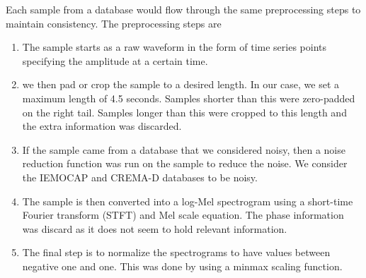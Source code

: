 \documentclass[conference]{IEEEtran}
\begin{document}
Each sample from a database would flow through the same preprocessing steps to maintain consistency. The preprocessing steps are
\begin{enumerate}
	\item The sample starts as a raw waveform in the form of time series points specifying the amplitude at a certain time.
	\item we then pad or crop the sample to a desired length. In our case, we set a maximum length of 4.5 seconds. Samples shorter than this were zero-padded on the right tail. Samples longer than this were cropped to this length and the extra information was discarded.
	\item If the sample came from a database that we considered noisy, then a noise reduction function was run on the sample to reduce the noise. We consider the IEMOCAP and CREMA-D databases to be noisy.
	\item The sample is then converted into a log-Mel spectrogram using a short-time Fourier transform (STFT) and Mel scale equation. The phase information was discard as it does not seem to hold relevant information. \cite{}
	\item The final step is to normalize the spectrograms to have values between negative one and one. This was done by using a minmax scaling function.
\end{enumerate}
\end{document}
